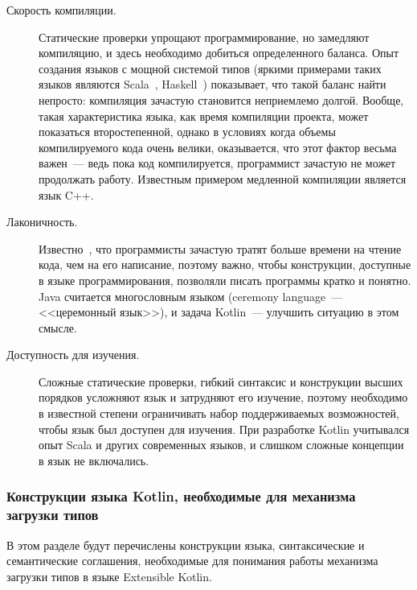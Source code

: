 \begin{description}
	\item[Скорость компиляции.] Статические проверки упрощают программирование, но замедляют компиляцию, и здесь необходимо добиться определенного баланса. Опыт создания языков с мощной системой типов (яркими примерами таких языков являются Scala~\cite{scala-spec}, Haskell~\cite{haskell98}) показывает, что такой баланс найти непросто: компиляция зачастую становится неприемлемо долгой.
	Вообще, такая характеристика языка, как время компиляции проекта, может показаться второстепенной, однако в условиях когда объемы компилируемого кода очень велики, оказывается, что этот фактор весьма важен~--- ведь пока код компилируется, программист зачастую не может продолжать работу. Известным примером медленной компиляции является язык C++.

	\item[Лаконичность.] Известно~\cite{codecomplete}, что программисты зачастую тратят больше времени на чтение кода, чем на его написание, поэтому важно, чтобы конструкции, доступные в языке программирования, позволяли писать программы кратко и понятно.
	Java считается многословным языком (ceremony language~--- <<церемонный язык>>), и задача Kotlin~--- улучшить ситуацию в этом смысле.

	\item[Доступность для изучения.] Сложные статические проверки, гибкий синтаксис и конструкции высших порядков усложняют язык и затрудняют его изучение, поэтому необходимо в известной степени ограничивать набор поддерживаемых возможностей, чтобы язык был доступен для изучения. При разработке Kotlin учитывался опыт Scala и других современных языков, и слишком сложные концепции в язык не включались.
\end{description}

\subsubsection{Конструкции языка Kotlin, необходимые для механизма загрузки типов}

В этом разделе будут перечислены конструкции языка, синтаксические и семантические соглашения, необходимые для понимания работы механизма загрузки типов в языке Extensible Kotlin.

